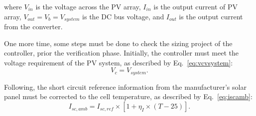 \documentclass[journal]{IEEEtran}
\begin{document}
\noindent where $ V_{in} $ is the voltage across the PV array, $ I_{in} $ is the output current of PV array, $ V_{out}=V_{b}=V_{system} $ is the  DC bus voltage, and $ I_{out} $ is the output current from the converter.

% 
%
%
%
% 
%  
% 
 
One more time, some steps must be done to check the sizing project of the controller, prior the verification phase. Initially, the controller must meet the voltage requirement of the PV system, as described by Eq.~\eqref{eq:vcvsystem}: 
\begin{equation}
\label{eq:vcvsystem}
V_{c} = V_{system}.
\end{equation}

Following, the short circuit reference information from the manufacturer's solar panel must be corrected to the cell temperature, as described by Eq.~\eqref{eq:iscamb}:
%
\begin{equation}
\label{eq:iscamb}
I_{sc,amb} = I_{sc,ref} \times \left[ 1 + \eta_{I} \times (T-25) \right]. 
\end{equation}
\end{document}
